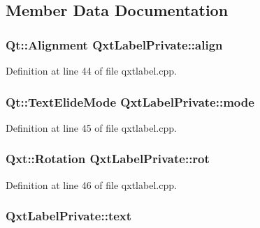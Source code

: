 \subsection{Member Data Documentation}
\hypertarget{class_qxt_label_private_af8c3df522f1c449c56c268c7b3ab3bb7}{
\subsubsection[{align}]{\setlength{\rightskip}{0pt plus 5cm}Qt\-::\-Alignment Qxt\-Label\-Private\-::align}}\label{class_qxt_label_private_af8c3df522f1c449c56c268c7b3ab3bb7}


Definition at line 44 of file qxtlabel.\-cpp.

\hypertarget{class_qxt_label_private_ada43d1aa852ad9fef6b605b85d3653f1}{
\subsubsection[{mode}]{\setlength{\rightskip}{0pt plus 5cm}Qt\-::\-Text\-Elide\-Mode Qxt\-Label\-Private\-::mode}}\label{class_qxt_label_private_ada43d1aa852ad9fef6b605b85d3653f1}


Definition at line 45 of file qxtlabel.\-cpp.

\hypertarget{class_qxt_label_private_a6e7a26bf3283fc44660c2b8fd35e866b}{
\subsubsection[{rot}]{\setlength{\rightskip}{0pt plus 5cm}Qxt\-::\-Rotation Qxt\-Label\-Private\-::rot}}\label{class_qxt_label_private_a6e7a26bf3283fc44660c2b8fd35e866b}


Definition at line 46 of file qxtlabel.\-cpp.

\hypertarget{class_qxt_label_private_a570ce02e6d9c6514366c6cb2651168c6}{
\subsubsection[{text}]{ Qxt\-Label\-Private\-::text}}\label{class_qxt_label_private_a570ce02e6d9c6514366c6cb2651168c6}



